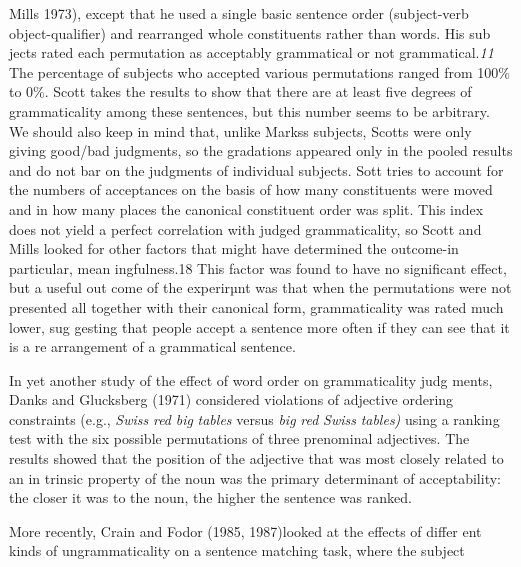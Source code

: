 \begin{styleTextbody}
Mills 1973), except that he used a single basic sentence order (subject-verb\- object-qualifier) and rearranged whole constituents rather than words. His sub\- jects rated each permutation as {\textquotedbl}acceptably grammatical{\textquotedbl} or {\textquotedbl}not grammatical.{\textquotedbl}\textit{11}\textit{ }The percentage of subjects who accepted various permutations ranged from 100\% to 0\%. Scott takes the results to show that there are at least five degrees of grammaticality among these sentences, but this number seems to be arbitrary. We should also keep in mind that, unlike Marks{\textquotesingle}s subjects, Scott{\textquotesingle}s were only giving good/bad judgments, so the gradations appeared only in the pooled results and do not bar on the judgments of individual subjects. Sott tries to account for the numbers of acceptances on the basis of how many constituents were moved and in how many places the canonical constituent order was split. This index does not yield a perfect correlation with judged grammaticality, so Scott and Mills looked for other factors that might have determined the outcome-in particular, mean\- ingfulness.18 This factor was found to have no significant effect, but a useful out\- come of the experirµnt was that when the permutations were not presented all together with their canonical form, grammaticality was rated much lower, sug\- gesting that people accept a sentence more often if they can see that it is a re\- arrangement of a grammatical sentence.
\end{styleTextbody}


\begin{styleTextbody}
In yet another study of the effect of word order on grammaticality judg\- ments, Danks and Glucksberg (1971) considered violations of adjective ordering constraints (e.g., \textit{Swiss}\textit{ }\textit{red}\textit{ }\textit{big}\textit{ }\textit{tables}\textit{ }versus \textit{big}\textit{ }\textit{red}\textit{ }\textit{Swiss}\textit{ }\textit{tables)}\textit{ }using a ranking test with the six possible permutations of three prenominal adjectives. The results showed that the position of the adjective that was most closely related to an in\- trinsic property of the noun was the primary determinant of acceptability: the closer it was to the noun, the higher the sentence was ranked.
\end{styleTextbody}


\begin{styleTextbody}
More recently, Crain and Fodor (1985, 1987)looked at the effects of differ\- ent kinds of ungrammaticality on a sentence matching task, where the subject
\end{styleTextbody}


